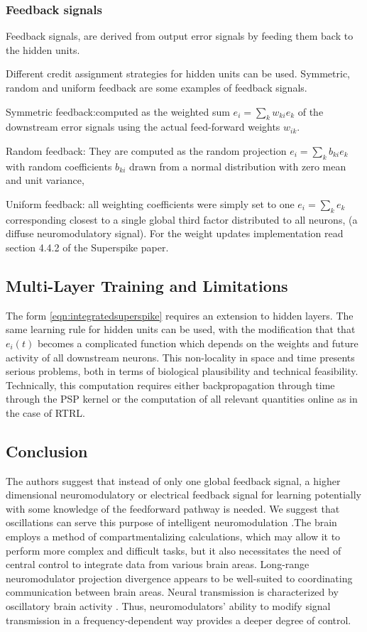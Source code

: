 \documentclass[12pt]{report}
\begin{document}
\subsubsection{Feedback signals}
Feedback signals, are derived from output error signals by feeding them back to the hidden units.

Different credit assignment strategies for hidden units can be used. Symmetric, random and uniform feedback are some examples of feedback signals. 

Symmetric feedback:computed as the weighted sum $e_{i}=\sum_{k} w_{k i} e_{k}$ of the downstream error signals using the actual feed-forward weights $w_{i k} .$  

Random feedback: They are computed as the random projection $e_{i}=\sum_{k} b_{k i} e_{k}$ with random coefficients $b_{k i}$ drawn from a normal distribution with zero mean and unit variance,

Uniform feedback: all weighting coefficients were simply set to one $e_{i}=\sum_{k} e_{k}$ corresponding closest to a single global third factor distributed to all neurons, (a diffuse neuromodulatory signal). For the weight updates implementation read section 4.4.2 of the Superspike paper.
\subsection{Multi-Layer Training and Limitations}
The form \ref{eqn:integratedsuperspike} requires an extension to hidden layers. The same learning rule for hidden units can be used, with the modification that that $e_{i}(t)$ becomes a complicated function which depends on the weights and future activity of all downstream neurons. This non-locality in space and time presents serious problems, both in terms of biological plausibility and technical feasibility. Technically, this computation requires either backpropagation through time through the PSP kernel or the computation of all relevant quantities online as in the case of RTRL.
\subsection{Conclusion}
The authors suggest that instead of only one global feedback signal, a higher dimensional neuromodulatory or electrical feedback signal for learning potentially with some knowledge of the feedforward pathway is needed. We suggest that oscillations can serve this purpose of intelligent neuromodulation .The brain employs a method of compartmentalizing calculations, which may allow it to perform more complex and difficult tasks, but it also necessitates the need of central control to integrate data from various brain areas. Long-range neuromodulator projection divergence appears to be well-suited to coordinating communication between brain areas. Neural transmission is characterized by oscillatory brain activity \cite{ito2008}. Thus, neuromodulators' ability to modify signal transmission in a frequency-dependent way provides a deeper degree of control.
\end{document}
